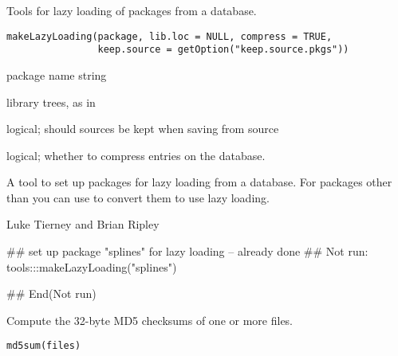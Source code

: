%
\begin{Description}\relax
Tools for lazy loading of packages from a database.
\end{Description}
%
\begin{Usage}
\begin{verbatim}
makeLazyLoading(package, lib.loc = NULL, compress = TRUE,
                keep.source = getOption("keep.source.pkgs"))
\end{verbatim}
\end{Usage}
%
\begin{Arguments}
\begin{ldescription}
\item[\code{package}] package name string
\item[\code{lib.loc}] library trees, as in 
\item[\code{keep.source}] logical; should sources be kept when saving from source
\item[\code{compress}] logical; whether to compress entries on the database.
\end{ldescription}
\end{Arguments}
%
\begin{Details}\relax
A tool to set up packages for lazy loading from a database.  For
packages other than  you can use
 to convert them to use lazy loading.
\end{Details}
%
\begin{Author}\relax
Luke Tierney and Brian Ripley
\end{Author}
%
\begin{Examples}
\begin{ExampleCode}
## set up package "splines" for lazy loading -- already done
## Not run: 
tools:::makeLazyLoading("splines")

## End(Not run)
\end{ExampleCode}
\end{Examples}
%
\begin{Description}\relax
Compute the 32-byte MD5 checksums of one or more files.
\end{Description}
%
\begin{Usage}
\begin{verbatim}
md5sum(files)
\end{verbatim}
\end{Usage}
